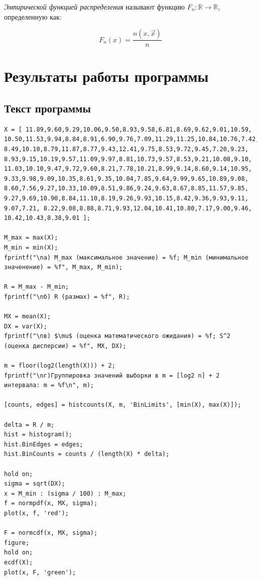 \documentclass[12pt]{report}
\begin{document}
\textit{Эмпирической функцией распределения} называют функцию $F_n: \mathbb{R} \to \mathbb{R}$, определенную как: 

\begin{equation}
	F_n(x) = \frac{n(x, \vec x)}{n}
\end{equation}

\chapter*{Результаты работы программы}

\section*{Текст программы}
\begin{lstlisting}[mathescape]
X = [ 11.89,9.60,9.29,10.06,9.50,8.93,9.58,6.81,8.69,9.62,9.01,10.59,
10.50,11.53,9.94,8.84,8.91,6.90,9.76,7.09,11.29,11.25,10.84,10.76,7.42,
8.49,10.10,8.79,11.87,8.77,9.43,12.41,9.75,8.53,9.72,9.45,7.20,9.23,
8.93,9.15,10.19,9.57,11.09,9.97,8.81,10.73,9.57,8.53,9.21,10.08,9.10,
11.03,10.10,9.47,9.72,9.60,8.21,7.78,10.21,8.99,9.14,8.60,9.14,10.95,
9.33,9.98,9.09,10.35,8.61,9.35,10.04,7.85,9.64,9.99,9.65,10.89,9.08,
8.60,7.56,9.27,10.33,10.09,8.51,9.86,9.24,9.63,8.67,8.85,11.57,9.85,
9.27,9.69,10.90,8.84,11.10,8.19,9.26,9.93,10.15,8.42,9.36,9.93,9.11,
9.07,7.21, 8.22,9.08,8.88,8.71,9.93,12.04,10.41,10.80,7.17,9.00,9.46,
10.42,10.43,8.38,9.01 ];

M_max = max(X);
M_min = min(X);
fprintf("\nа) M_max (максимальное значение) = %f; M_min (минимальное значенение) = %f", M_max, M_min);

R = M_max - M_min;
fprintf("\nб) R (размах) = %f", R);

MX = mean(X);
DX = var(X);
fprintf("\nв) $\mu$ (оценка математического ожидания) = %f; S^2 (оценка дисперсии) = %f", MX, DX);

m = floor(log2(length(X))) + 2;
fprintf("\nг)Группировка значений выборки в m = [log2 n] + 2 интервала: m = %f\n", m);

[counts, edges] = histcounts(X, m, 'BinLimits', [min(X), max(X)]);

delta = R / m;
hist = histogram();
hist.BinEdges = edges;
hist.BinCounts = counts / (length(X) * delta);

hold on; 
sigma = sqrt(DX);
x = M_min : (sigma / 100) : M_max;
f = normpdf(x, MX, sigma);
plot(x, f, 'red');

F = normcdf(x, MX, sigma);
figure;
hold on;
ecdf(X);
plot(x, F, 'green');
\end{lstlisting}
\end{document}
